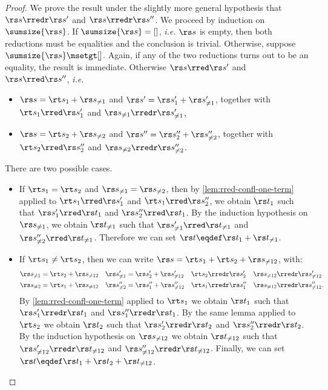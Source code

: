 	\begin{proof}
	We prove the result under the slightly more general hypothesis
	that $\rs s \rredr \rs s'$ and $\rs s \rredr \rs s''$.
	We proceed by induction on $\sumsize{\rs s}$.
	If $\sumsize{\rs s} = []$, \emph{i.e.} $\rs s$ is empty,
	then both reductions must be equalities
	and the conclusion is trivial.
	Otherwise, suppose $\sumsize{\rs s} \msetgt []$.
	Again, if any of the two reductions
	turns out to be an equality, the result is immediate.
	Otherwise $\rs s \rred \rs s'$ and $\rs s \rred \rs s''$, \emph{i.e.}
	\begin{itemize}
	\item $\rs s = \rt s_1 + \rs s_{\neq 1}$
		and $\rs s' = \rs s'_1 + \rs s'_{\neq 1}$,
		together with $\rt s_1 \rred \rs s'_1$
		and $\rs s_{\neq 1} \rredr \rs s'_{\neq 1}$,
	\item $\rs s = \rt s_2 + \rs s_{\neq 2}$
		and $\rs s'' = \rs s''_2 + \rs s''_{\neq 2}$,
		together with $\rt s_2 \rred \rs s''_2$
		and $\rs s_{\neq 2} \rredr \rs s''_{\neq 2}$.
	\end{itemize}
	There are two possible cases.
	\begin{itemize}
	\item If $\rt s_1 = \rt s_2$ and $\rs s_{\neq 1} = \rs s_{\neq 2}$,
		then by \cref{lem:rred-confl-one-term} applied to
		$\rt s_1 \rred \rs s'_1$ and $\rt s_1 \rred \rs s''_2$,
		we obtain $\rs t_1$ such that
		$\rs s'_1 \rred \rs t_1$ and $\rs s''_2 \rred \rs t_1$.
		By the induction hypothesis on $\rs s_{\neq 1}$,
		we obtain $\rs t_{\neq 1}$ such that
		$\rs s'_{\neq 1} \rred \rs t_{\neq 1}$ 
		and $\rs s''_{\neq 2} \rred \rs t_{\neq 1}$.
		Therefore we can set $\rs t \eqdef \rs t_1 + \rs t_{\neq 1}$.
	\item If $\rt s_1 \neq \rt s_2$, then we can write
		$\rs s = \rt s_1 + \rt s_2 + \rs s_{\neq 12}$, with:
		\begin{align*}
			\rs s_{\neq 1} & = \rt s_2 + \rs s_{\neq 12} &
			\rs s'_{\neq 1} & = \rs s'_2 + \rs s'_{\neq 12} &
			\rt s_2 & \rredr \rs s'_2 &
			\rs s_{\neq 12} & \rredr \rs s'_{\neq 12} \\
			\rs s_{\neq 2} & = \rt s_1 + \rs s_{\neq 12} &
			\rs s''_{\neq 2} & = \rs s''_1 + \rs s''_{\neq 12} &
			\rt s_1 & \rredr \rs s''_1 &
			\rs s_{\neq 12} & \rredr \rs s''_{\neq 12}.
		\end{align*}
		By \cref{lem:rred-confl-one-term} applied to $\rt s_1$
		we obtain $\rs t_1$ such that
		$\rs s'_1 \rredr \rs t_1$ and $\rs s''_1 \rredr \rs t_1$.
		By the same lemma applied to $\rt s_2$
		we obtain $\rs t_2$ such that
		$\rs s'_2 \rredr \rs t_2$ and $\rs s''_2 \rredr \rs t_2$.
		By the induction hypothesis on $\rs s_{\neq 12}$
		we obtain $\rs t_{\neq 12}$ such that
		$\rs s'_{\neq 12} \rredr \rs t_{\neq 12}$
		and $\rs s''_{\neq 12} \rredr \rs t_{\neq 12}$.
		Finally, we can set $\rs t \eqdef 
		\rs t_1 + \rs t_2 + \rs t_{\neq 12}$.
	\qedhere
	\end{itemize}
	\end{proof}

